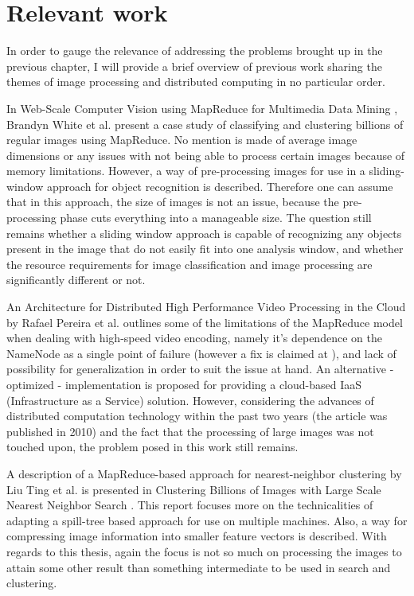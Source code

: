 \documentclass [12pt,a4paper]{report}
\begin{document}
\section{Relevant work}

In order to gauge the relevance of addressing the problems brought up in the previous chapter, I will provide a brief overview of previous work sharing the themes of image processing and distributed computing in no particular order. 

In Web-Scale Computer Vision using MapReduce for Multimedia Data Mining \cite{White:2010:WCV:1814245.1814254}, Brandyn White et al. present a case study of classifying and clustering billions of regular images using MapReduce. No mention is made of average image dimensions or any issues with not being able to process certain images because of memory limitations. However, a way of pre-processing images for use in a sliding-window approach for object recognition is described. Therefore one can assume that in this approach, the size of images is not an issue, because the pre-processing phase cuts everything into a manageable size. The question still remains whether a sliding window approach is capable of recognizing any objects present in the image that do not easily fit into one analysis window, and whether the resource requirements for image classification and image processing are significantly different or not.

An Architecture for Distributed High Performance Video Processing in the Cloud \cite{Pereira:2010:ADH:1844768.1845374} by Rafael Pereira et al. outlines some of the limitations of the MapReduce model when dealing with high-speed video encoding, namely it's dependence on the NameNode as a single point of failure (however a fix is claimed at \cite{website:facebook_namenode_improvements}), and lack of possibility for generalization in order to suit the issue at hand. An alternative - optimized - implementation is proposed for providing a cloud-based IaaS (Infrastructure as a Service) solution. However, considering the advances of distributed computation technology within the past two years (the article was published in 2010) and the fact that the processing of large images was not touched upon, the problem posed in this work still remains.

A description of a MapReduce-based approach for nearest-neighbor clustering by Liu Ting et al. is presented in Clustering Billions of Images with Large Scale Nearest Neighbor Search \cite{citeulike:2631015}. This report focuses more on the technicalities of adapting a spill-tree based approach for use on multiple machines. Also, a way for compressing image information into smaller feature vectors is described. With regards to this thesis, again the focus is not so much on processing the images to attain some other result than something intermediate to be used in search and clustering.
\end{document}
